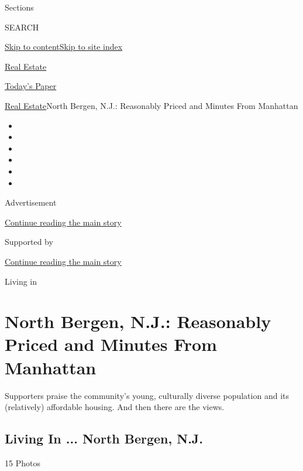 Sections

SEARCH

\protect\hyperlink{site-content}{Skip to
content}\protect\hyperlink{site-index}{Skip to site index}

\href{https://www.nytimes.com/section/realestate}{Real Estate}

\href{https://myaccount.nytimes.com/auth/login?response_type=cookie\&client_id=vi}{}

\href{https://www.nytimes.com/section/todayspaper}{Today's Paper}

\href{/section/realestate}{Real Estate}\textbar{}North Bergen, N.J.:
Reasonably Priced and Minutes From Manhattan

\begin{itemize}
\item
\item
\item
\item
\item
\item
\end{itemize}

Advertisement

\protect\hyperlink{after-top}{Continue reading the main story}

Supported by

\protect\hyperlink{after-sponsor}{Continue reading the main story}

Living in

\hypertarget{north-bergen-nj-reasonably-priced-and-minutes-from-manhattan}{%
\section{North Bergen, N.J.: Reasonably Priced and Minutes From
Manhattan}\label{north-bergen-nj-reasonably-priced-and-minutes-from-manhattan}}

Supporters praise the community's young, culturally diverse population
and its (relatively) affordable housing. And then there are the views.

\href{https://www.nytimes.com/slideshow/2020/07/29/realestate/living-in-north-bergen-nj.html}{}

\hypertarget{living-in--north-bergen-nj}{%
\subsection{Living In ... North Bergen,
N.J.}\label{living-in--north-bergen-nj}}

15 Photos

